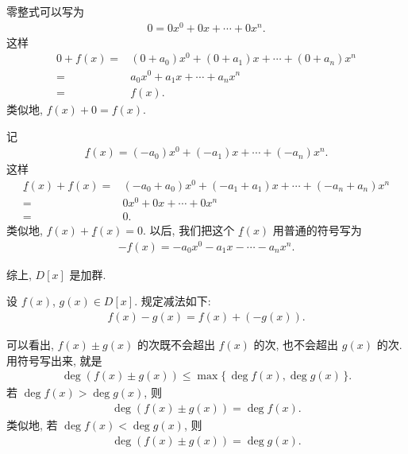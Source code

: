 \begin{pf}
    零整式可以写为
    \begin{align*}
        0 = 0x^0 + 0x + \cdots + 0x^n.
    \end{align*}
    这样
    \begin{align*}
        0 + f(x)
        = {} & (0 + a_0) x^0 + (0 + a_1) x + \cdots + (0 + a_n) x^n \\
        = {} & a_0 x^0 + a_1 x + \cdots + a_n x^n                   \\
        = {} & f(x).
    \end{align*}
    类似地, $f(x) + 0 = f(x)$.

    记
    \begin{align*}
        \underline{f}(x) = (-a_0) x^0 + (-a_1) x + \cdots + (-a_n) x^n.
    \end{align*}
    这样
    \begin{align*}
        \underline{f}(x) + f(x)
        = {} & (-a_0 + a_0) x^0 + (-a_1 + a_1) x + \cdots + (-a_n + a_n) x^n \\
        = {} & 0 x^0 + 0 x + \cdots + 0 x^n                                  \\
        = {} & 0.
    \end{align*}
    类似地, $f(x) + \underline{f}(x) = 0$. 以后, 我们把这个 $\underline{f}(x)$ 用普通的符号写为
    \begin{align*}
        -f(x) = -a_0 x^0 - a_1 x - \cdots - a_n x^n.
    \end{align*}

    综上, $D[x]$ 是加群.
\end{pf}

\begin{definition}
    设 $f(x)$, $g(x) \in D[x]$. 规定减法如下:
    \begin{align*}
        f(x) - g(x) = f(x) + (-g(x)).
    \end{align*}
\end{definition}

\begin{remark}
    可以看出, $f(x) \pm g(x)$ 的次既不会超出 $f(x)$ 的次, 也不会超出 $g(x)$ 的次. 用符号写出来, 就是
    \begin{align*}
        \deg (f(x) \pm g(x)) \leq \max \{\, \deg f(x), \deg g(x) \,\}.
    \end{align*}
    若 $\deg f(x) > \deg g(x)$, 则
    \begin{align*}
        \deg (f(x) \pm g(x)) = \deg f(x).
    \end{align*}
    类似地, 若 $\deg f(x) < \deg g(x)$, 则
    \begin{align*}
        \deg (f(x) \pm g(x)) = \deg g(x).
    \end{align*}
\end{remark}

